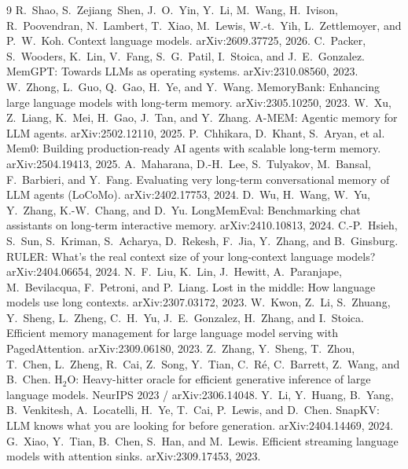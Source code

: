 \documentclass[10pt]{article}
\begin{document}
\begin{thebibliography}{9}
 R.~Shao, S.~Zejiang~Shen, J.~O.~Yin, Y.~Li, M.~Wang, H.~Ivison, R.~Poovendran, N.~Lambert, T.~Xiao, M.~Lewis, W.-t.~Yih, L.~Zettlemoyer, and P.~W.~Koh. \newblock Context language models. \newblock arXiv:2609.37725, 2026.
 C.~Packer, S.~Wooders, K.~Lin, V.~Fang, S.~G.~Patil, I.~Stoica, and J.~E.~Gonzalez. \newblock MemGPT: Towards LLMs as operating systems. \newblock arXiv:2310.08560, 2023.
 W.~Zhong, L.~Guo, Q.~Gao, H.~Ye, and Y.~Wang. \newblock MemoryBank: Enhancing large language models with long-term memory. \newblock arXiv:2305.10250, 2023.
 W.~Xu, Z.~Liang, K.~Mei, H.~Gao, J.~Tan, and Y.~Zhang. \newblock A-MEM: Agentic memory for LLM agents. \newblock arXiv:2502.12110, 2025.
 P.~Chhikara, D.~Khant, S.~Aryan, et al. \newblock Mem0: Building production-ready AI agents with scalable long-term memory. \newblock arXiv:2504.19413, 2025.
 A.~Maharana, D.-H.~Lee, S.~Tulyakov, M.~Bansal, F.~Barbieri, and Y.~Fang. \newblock Evaluating very long-term conversational memory of LLM agents (LoCoMo). \newblock arXiv:2402.17753, 2024.
 D.~Wu, H.~Wang, W.~Yu, Y.~Zhang, K.-W.~Chang, and D.~Yu. \newblock LongMemEval: Benchmarking chat assistants on long-term interactive memory. \newblock arXiv:2410.10813, 2024.
 C.-P.~Hsieh, S.~Sun, S.~Kriman, S.~Acharya, D.~Rekesh, F.~Jia, Y.~Zhang, and B.~Ginsburg. \newblock RULER: What's the real context size of your long-context language models? \newblock arXiv:2404.06654, 2024.
 N.~F.~Liu, K.~Lin, J.~Hewitt, A.~Paranjape, M.~Bevilacqua, F.~Petroni, and P.~Liang. \newblock Lost in the middle: How language models use long contexts. \newblock arXiv:2307.03172, 2023.
 W.~Kwon, Z.~Li, S.~Zhuang, Y.~Sheng, L.~Zheng, C.~H.~Yu, J.~E.~Gonzalez, H.~Zhang, and I.~Stoica. \newblock Efficient memory management for large language model serving with PagedAttention. \newblock arXiv:2309.06180, 2023.
 Z.~Zhang, Y.~Sheng, T.~Zhou, T.~Chen, L.~Zheng, R.~Cai, Z.~Song, Y.~Tian, C.~R\'e, C.~Barrett, Z.~Wang, and B.~Chen. \newblock H$_2$O: Heavy-hitter oracle for efficient generative inference of large language models. \newblock NeurIPS 2023 / arXiv:2306.14048.
 Y.~Li, Y.~Huang, B.~Yang, B.~Venkitesh, A.~Locatelli, H.~Ye, T.~Cai, P.~Lewis, and D.~Chen. \newblock SnapKV: LLM knows what you are looking for before generation. \newblock arXiv:2404.14469, 2024.
 G.~Xiao, Y.~Tian, B.~Chen, S.~Han, and M.~Lewis. \newblock Efficient streaming language models with attention sinks. \newblock arXiv:2309.17453, 2023.
\end{thebibliography}
\end{document}

